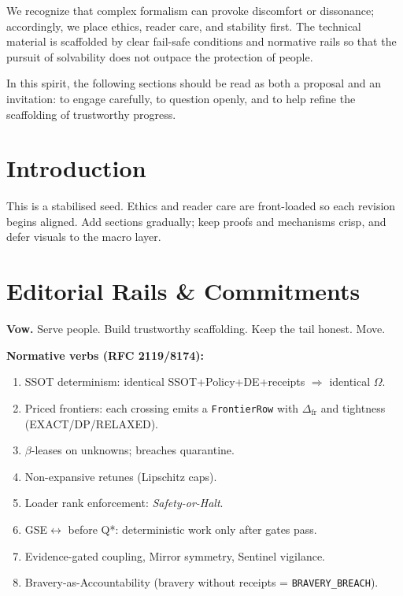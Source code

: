 \documentclass[11pt]{article}
\begin{document}
We recognize that complex formalism can provoke discomfort or dissonance; accordingly, we place ethics, reader care, and stability first. The technical material is scaffolded by clear fail-safe conditions and normative rails so that the pursuit of solvability does not outpace the protection of people.  

In this spirit, the following sections should be read as both a proposal and an invitation: to engage carefully, to question openly, and to help refine the scaffolding of trustworthy progress.



\section{Introduction}
This is a stabilised seed. Ethics and reader care are front-loaded so each revision begins aligned. Add sections gradually; keep proofs and mechanisms crisp, and defer visuals to the macro layer.

\section{Editorial Rails \& Commitments}
\textbf{Vow.} Serve people. Build trustworthy scaffolding. Keep the tail honest. Move.

\noindent\textbf{Normative verbs (RFC 2119/8174):}
\begin{enumerate}[leftmargin=1.3em,label=\textbf{C\arabic*.}]
  \item SSOT determinism: identical SSOT+Policy+DE+receipts $\Rightarrow$ identical $\Omega$.
  \item Priced frontiers: each crossing emits a \texttt{FrontierRow} with $\Delta_{\mathrm{fr}}$ and tightness (EXACT/DP/RELAXED).
  \item $\beta$-leases on unknowns; breaches quarantine.
  \item Non-expansive retunes (Lipschitz caps).
  \item Loader rank enforcement: \emph{Safety-or-Halt}.
  \item GSE\texorpdfstring{$\leftrightarrow$}{↔} before Q*: deterministic work only after gates pass.
  \item Evidence-gated coupling, Mirror symmetry, Sentinel vigilance.
  \item Bravery-as-Accountability (bravery without receipts = \texttt{BRAVERY\_BREACH}).
\end{enumerate}
\end{document}
